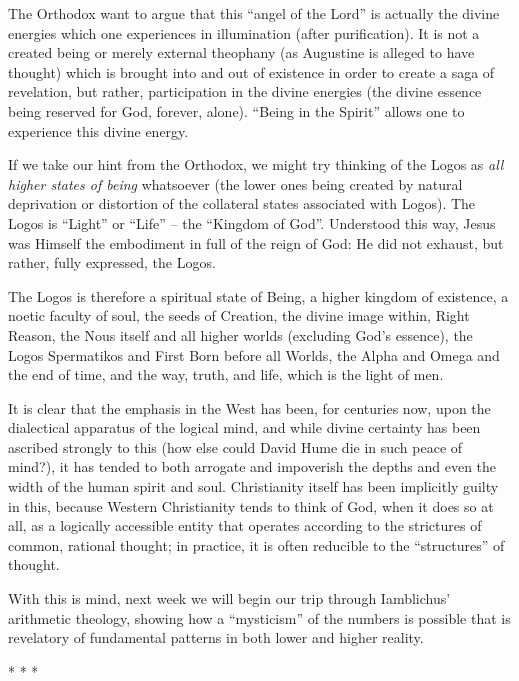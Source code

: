 The Orthodox want to argue that this ``angel of the Lord'' is actually the divine energies which one experiences in illumination (after purification). It is not a created being or merely external theophany (as Augustine is alleged to have thought) which is brought into and out of existence in order to create a saga of revelation, but rather, participation in the divine energies (the divine essence being reserved for God, forever, alone). ``Being in the Spirit'' allows one to experience this divine energy.

If we take our hint from the Orthodox, we might try thinking of the Logos as \emph{all higher states of being} whatsoever (the lower ones being created by natural deprivation or distortion of the collateral states associated with Logos). The Logos is ``Light'' or ``Life'' -- the ``Kingdom of God''. Understood this way, Jesus was Himself the embodiment in full of the reign of God: He did not exhaust, but rather, fully expressed, the Logos.

The Logos is therefore a spiritual state of Being, a higher kingdom of existence, a noetic faculty of soul, the seeds of Creation, the divine image within, Right Reason, the Nous itself and all higher worlds (excluding God's essence), the Logos Spermatikos and First Born before all Worlds, the Alpha and Omega and the end of time, and the way, truth, and life, which is the light of men.

It is clear that the emphasis in the West has been, for centuries now, upon the dialectical apparatus of the logical mind, and while divine certainty has been ascribed strongly to this (how else could David Hume die in such peace of mind?), it has tended to both arrogate and impoverish the depths and even the width of the human spirit and soul. Christianity itself has been implicitly guilty in this, because Western Christianity tends to think of God, when it does so at all, as a logically accessible entity that operates according to the strictures of common, rational thought; in practice, it is often reducible to the ``structures'' of thought.

With this is mind, next week we will begin our trip through Iamblichus' arithmetic theology, showing how a ``mysticism'' of the numbers is possible that is revelatory of fundamental patterns in both lower and higher reality.



\begin{center}* * *\end{center}

